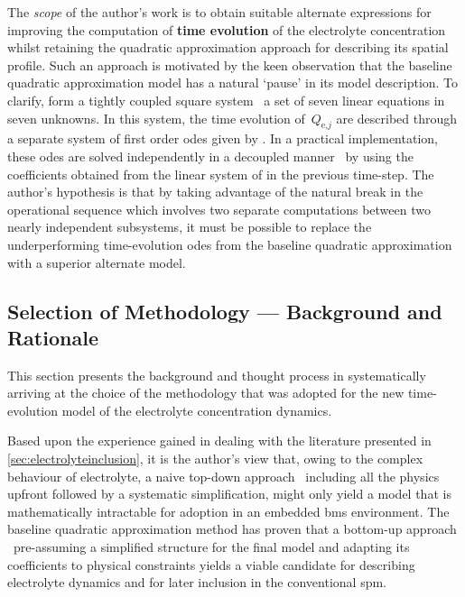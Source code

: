 The  \emph{scope}  of  the  author's   work  is  to  obtain  suitable  alternate
expressions  for  improving  the   computation  of  \textbf{time  evolution}  of
the  electrolyte  concentration  whilst retaining  the  quadratic  approximation
approach   for   describing  its   spatial   profile.   Such  an   approach   is
motivated   by    the   keen    observation   that   the    baseline   quadratic
approximation  model  has  a  natural  `pause'  in  its  model  description.  To
clarify,   form a  tightly
coupled  square  system  \ie~a  set   of  seven  linear  equations  in  seven
unknowns.   In   this   system,   the   time   evolution   of~$Q_{\text{e,}j}$
are   described  through   a  separate   system  of   first  order   \glspl{ode}
given by .  In a
practical  implementation,  these  \glspl{ode}  are solved  independently  in  a
decoupled  manner \ie~by  using  the coefficients  obtained  from the  linear
system of  in the previous
time-step. The  author's hypothesis is that  by taking advantage of  the natural
break  in the  operational  sequence which  involves  two separate  computations
between  two nearly  independent  subsystems,  it must  be  possible to  replace
the  underperforming  time-evolution  \glspl{ode} from  the  baseline  quadratic
approximation with a superior alternate model.

\subsection{Selection of Methodology --- Background and Rationale}\label{subsec:sysidbackground}


This  section presents  the  background and  thought  process in  systematically
arriving  at  the  choice of  the  methodology  that  was  adopted for  the  new
time-evolution model of the electrolyte concentration dynamics.

Based  upon the  experience  gained  in dealing  with  the literature  presented
in \cref{sec:electrolyteinclusion}, it is  the author's view that,  owing to the
complex behaviour of electrolyte, a  naive top-down approach \ie~including all
the physics upfront followed by a  systematic simplification, might only yield a
model that is  mathematically intractable for adoption in  an embedded \gls{bms}
environment.  The baseline  quadratic  approximation method  has  proven that  a
bottom-up approach \ie~pre-assuming a simplified structure for the final model
and adapting its coefficients to  physical constraints yields a viable candidate
for describing electrolyte dynamics and  for later inclusion in the conventional
\gls{spm}.

